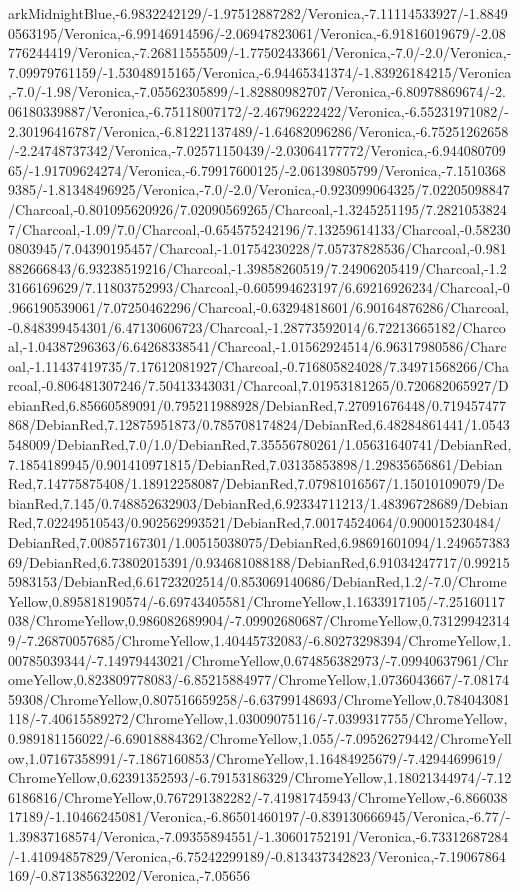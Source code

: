 {\begin{tikzternal}
arkMidnightBlue,-6.9832242129/-1.97512887282/Veronica,-7.11114533927/-1.88490563195/Veronica,-6.99146914596/-2.06947823061/Veronica,-6.91816019679/-2.08776244419/Veronica,-7.26811555509/-1.77502433661/Veronica,-7.0/-2.0/Veronica,-7.09979761159/-1.53048915165/Veronica,-6.94465341374/-1.83926184215/Veronica,-7.0/-1.98/Veronica,-7.05562305899/-1.82880982707/Veronica,-6.80978869674/-2.06180339887/Veronica,-6.75118007172/-2.46796222422/Veronica,-6.55231971082/-2.30196416787/Veronica,-6.81221137489/-1.64682096286/Veronica,-6.75251262658/-2.24748737342/Veronica,-7.02571150439/-2.03064177772/Veronica,-6.94408070965/-1.91709624274/Veronica,-6.79917600125/-2.06139805799/Veronica,-7.15103689385/-1.81348496925/Veronica,-7.0/-2.0/Veronica,-0.923099064325/7.02205098847/Charcoal,-0.801095620926/7.02090569265/Charcoal,-1.3245251195/7.28210538247/Charcoal,-1.09/7.0/Charcoal,-0.654575242196/7.13259614133/Charcoal,-0.582300803945/7.04390195457/Charcoal,-1.01754230228/7.05737828536/Charcoal,-0.981882666843/6.93238519216/Charcoal,-1.39858260519/7.24906205419/Charcoal,-1.23166169629/7.11803752993/Charcoal,-0.605994623197/6.69216926234/Charcoal,-0.966190539061/7.07250462296/Charcoal,-0.63294818601/6.90164876286/Charcoal,-0.848399454301/6.47130606723/Charcoal,-1.28773592014/6.72213665182/Charcoal,-1.04387296363/6.64268338541/Charcoal,-1.01562924514/6.96317980586/Charcoal,-1.11437419735/7.17612081927/Charcoal,-0.716805824028/7.34971568266/Charcoal,-0.806481307246/7.50413343031/Charcoal,7.01953181265/0.720682065927/DebianRed,6.85660589091/0.795211988928/DebianRed,7.27091676448/0.719457477868/DebianRed,7.12875951873/0.785708174824/DebianRed,6.48284861441/1.0543548009/DebianRed,7.0/1.0/DebianRed,7.35556780261/1.05631640741/DebianRed,7.1854189945/0.901410971815/DebianRed,7.03135853898/1.29835656861/DebianRed,7.14775875408/1.18912258087/DebianRed,7.07981016567/1.15010109079/DebianRed,7.145/0.748852632903/DebianRed,6.92334711213/1.48396728689/DebianRed,7.02249510543/0.902562993521/DebianRed,7.00174524064/0.900015230484/DebianRed,7.00857167301/1.00515038075/DebianRed,6.98691601094/1.24965738369/DebianRed,6.73802015391/0.934681088188/DebianRed,6.91034247717/0.992155983153/DebianRed,6.61723202514/0.853069140686/DebianRed,1.2/-7.0/ChromeYellow,0.895818190574/-6.69743405581/ChromeYellow,1.1633917105/-7.25160117038/ChromeYellow,0.986082689904/-7.09902680687/ChromeYellow,0.731299423149/-7.26870057685/ChromeYellow,1.40445732083/-6.80273298394/ChromeYellow,1.00785039344/-7.14979443021/ChromeYellow,0.674856382973/-7.09940637961/ChromeYellow,0.823809778083/-6.85215884977/ChromeYellow,1.0736043667/-7.0817459308/ChromeYellow,0.807516659258/-6.63799148693/ChromeYellow,0.784043081118/-7.40615589272/ChromeYellow,1.03009075116/-7.0399317755/ChromeYellow,0.989181156022/-6.69018884362/ChromeYellow,1.055/-7.09526279442/ChromeYellow,1.07167358991/-7.1867160853/ChromeYellow,1.16484925679/-7.42944699619/ChromeYellow,0.62391352593/-6.79153186329/ChromeYellow,1.18021344974/-7.126186816/ChromeYellow,0.767291382282/-7.41981745943/ChromeYellow,-6.86603817189/-1.10466245081/Veronica,-6.86501460197/-0.839130666945/Veronica,-6.77/-1.39837168574/Veronica,-7.09355894551/-1.30601752191/Veronica,-6.73312687284/-1.41094857829/Veronica,-6.75242299189/-0.813437342823/Veronica,-7.19067864169/-0.871385632202/Veronica,-7.05656
\end{tikzternal}}
